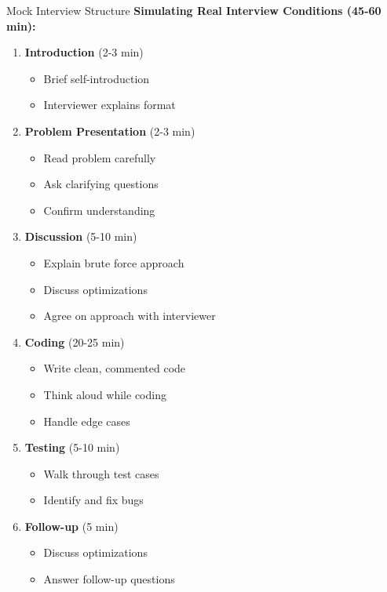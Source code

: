 \documentclass[aspectratio=169,xcolor=dvipsnames]{beamer}
\begin{document}
\begin{frame}{Mock Interview Structure}
  \textbf{Simulating Real Interview Conditions (45-60 min):}

  \vspace{0.3cm}
  \begin{enumerate}
    \item \textbf{Introduction} (2-3 min)
    \begin{itemize}
      \item Brief self-introduction
      \item Interviewer explains format
    \end{itemize}

    \vspace{0.2cm}
    \item \textbf{Problem Presentation} (2-3 min)
    \begin{itemize}
      \item Read problem carefully
      \item Ask clarifying questions
      \item Confirm understanding
    \end{itemize}

    \vspace{0.2cm}
    \item \textbf{Discussion} (5-10 min)
    \begin{itemize}
      \item Explain brute force approach
      \item Discuss optimizations
      \item Agree on approach with interviewer
    \end{itemize}

    \vspace{0.2cm}
    \item \textbf{Coding} (20-25 min)
    \begin{itemize}
      \item Write clean, commented code
      \item Think aloud while coding
      \item Handle edge cases
    \end{itemize}

    \vspace{0.2cm}
    \item \textbf{Testing} (5-10 min)
    \begin{itemize}
      \item Walk through test cases
      \item Identify and fix bugs
    \end{itemize}

    \vspace{0.2cm}
    \item \textbf{Follow-up} (5 min)
    \begin{itemize}
      \item Discuss optimizations
      \item Answer follow-up questions
    \end{itemize}
  \end{enumerate}
\end{frame}
\end{document}
